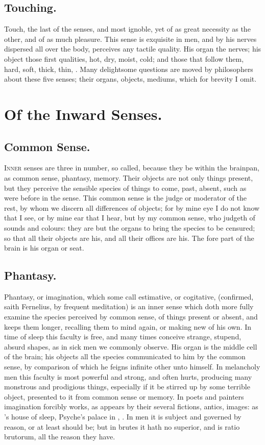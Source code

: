 {\subsection{Touching.}
Touch, the last of the senses, and most ignoble, yet of as
great necessity as the other, and of as much pleasure. This sense is
exquisite in men, and by his nerves dispersed all over the body,
perceives any tactile quality. His organ the nerves; his object those
first qualities, hot, dry, moist, cold; and those that follow them,
hard, soft, thick, thin, \etc{}. Many delightsome questions are moved by
philosophers about these five senses; their organs, objects, mediums,
which for brevity I omit.

\section{Of the Inward Senses.}

\subsection{Common Sense.}
\lettrine{I}{nner} senses are three in number, so called, because
they be within the brainpan, as common sense, phantasy, memory. Their
objects are not only things present, but they perceive the sensible
species of things to come, past, absent, such as were before in the
sense. This common sense is the judge or moderator of the rest, by whom
we discern all differences of objects; for by mine eye I do not know
that I see, or by mine ear that I hear, but by my common sense, who
judgeth of sounds and colours: they are but the organs to bring the
species to be censured; so that all their objects are his, and all
their offices are his. The fore part of the brain is his organ or seat.
\subsection{Phantasy.}
Phantasy, or imagination, which some call estimative, or
cogitative, (confirmed, saith Fernelius, by frequent meditation)
is an inner sense which doth more fully examine the species perceived
by common sense, of things present or absent, and keeps them longer,
recalling them to mind again, or making new of his own. In time of
sleep this faculty is free, and many times conceive strange, stupend,
absurd shapes, as in sick men we commonly observe. His organ is the
middle cell of the brain; his objects all the species communicated to
him by the common sense, by comparison of which he feigns infinite
other unto himself. In melancholy men this faculty is most powerful and
strong, and often hurts, producing many monstrous and prodigious
things, especially if it be stirred up by some terrible object,
presented to it from common sense or memory. In poets and painters
imagination forcibly works, as appears by their several fictions,
antics, images: as \Ovid's house of sleep, Psyche's palace in \Apuleius,
\etc{}. In men it is subject and governed by reason, or at least should be;
but in brutes it hath no superior, and is ratio brutorum, all the
reason they have.
}
